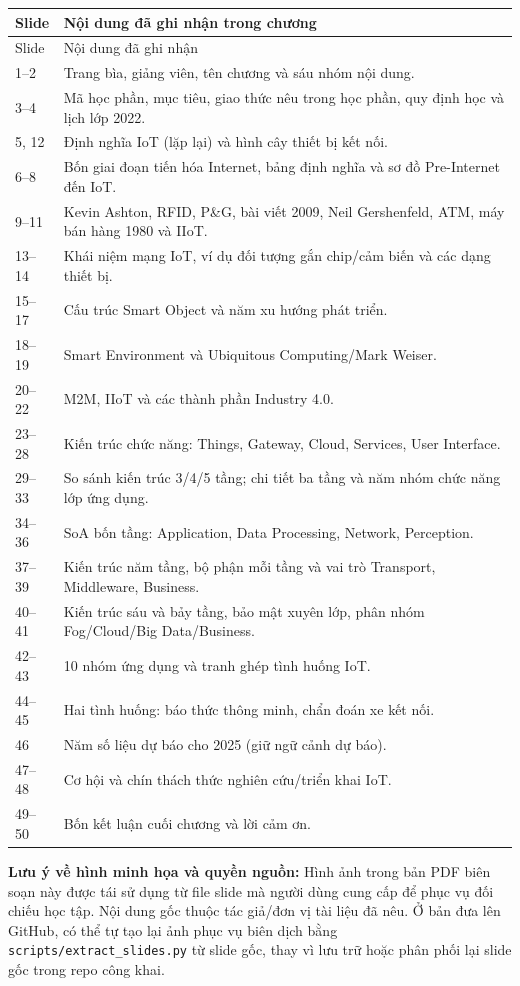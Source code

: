 \begin{longtable}{@{}p{.14\linewidth}p{.79\linewidth}@{}}\toprule
Slide & Nội dung đã ghi nhận trong chương\\\midrule\endfirsthead\toprule Slide & Nội dung đã ghi nhận\\\midrule\endhead
1--2 & Trang bìa, giảng viên, tên chương và sáu nhóm nội dung.\\
3--4 & Mã học phần, mục tiêu, giao thức nêu trong học phần, quy định học và lịch lớp 2022.\\
5, 12 & Định nghĩa IoT (lặp lại) và hình cây thiết bị kết nối.\\
6--8 & Bốn giai đoạn tiến hóa Internet, bảng định nghĩa và sơ đồ Pre-Internet đến IoT.\\
9--11 & Kevin Ashton, RFID, P\&G, bài viết 2009, Neil Gershenfeld, ATM, máy bán hàng 1980 và IIoT.\\
13--14 & Khái niệm mạng IoT, ví dụ đối tượng gắn chip/cảm biến và các dạng thiết bị.\\
15--17 & Cấu trúc Smart Object và năm xu hướng phát triển.\\
18--19 & Smart Environment và Ubiquitous Computing/Mark Weiser.\\
20--22 & M2M, IIoT và các thành phần Industry 4.0.\\
23--28 & Kiến trúc chức năng: Things, Gateway, Cloud, Services, User Interface.\\
29--33 & So sánh kiến trúc 3/4/5 tầng; chi tiết ba tầng và năm nhóm chức năng lớp ứng dụng.\\
34--36 & SoA bốn tầng: Application, Data Processing, Network, Perception.\\
37--39 & Kiến trúc năm tầng, bộ phận mỗi tầng và vai trò Transport, Middleware, Business.\\
40--41 & Kiến trúc sáu và bảy tầng, bảo mật xuyên lớp, phân nhóm Fog/Cloud/Big Data/Business.\\
42--43 & 10 nhóm ứng dụng và tranh ghép tình huống IoT.\\
44--45 & Hai tình huống: báo thức thông minh, chẩn đoán xe kết nối.\\
46 & Năm số liệu dự báo cho 2025 (giữ ngữ cảnh dự báo).\\
47--48 & Cơ hội và chín thách thức nghiên cứu/triển khai IoT.\\
49--50 & Bốn kết luận cuối chương và lời cảm ơn.\\\bottomrule
\end{longtable}
\normalsize
\noindent\textbf{Lưu ý về hình minh họa và quyền nguồn:} Hình ảnh trong bản PDF biên soạn này được tái sử dụng từ file slide mà người dùng cung cấp để phục vụ đối chiếu học tập. Nội dung gốc thuộc tác giả/đơn vị tài liệu đã nêu. Ở bản đưa lên GitHub, có thể tự tạo lại ảnh phục vụ biên dịch bằng \texttt{scripts/extract\_slides.py} từ slide gốc, thay vì lưu trữ hoặc phân phối lại slide gốc trong repo công khai.